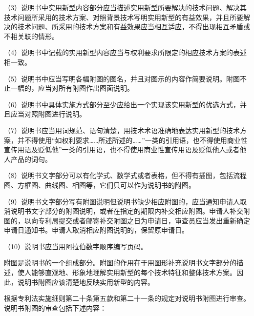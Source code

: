 {\setlength{\parindent}{17.1bp}（3）说明书中实用新型内容部分应当描述实用新型所要解决的技术问题、解决其技术问题所采用的技术方案、对照背景技术写明实用新型的有益效果，并且所要解决的技术问题、所采用的技术方案和有益效果应当相互适应，不得出现相互矛盾或不相关联的情形。\par}

{\setlength{\parindent}{17.1bp}（4）说明书中记载的实用新型内容应当与权利要求所限定的相应技术方案的表述相一致。\par}

{\setlength{\parindent}{17.1bp}（5）说明书中应当写明各幅附图的图名，并且对图示的内容作简要说明。附图不止一幅的，应当对所有附图作出图面说明。\par}

{\setlength{\parindent}{17.1bp}（6）说明书中具体实施方式部分至少应给出一个实现该实用新型的优选方式，并且应当对照附图进行说明。\par}

{\setlength{\parindent}{17.1bp}（7）说明书应当用词规范、语句清楚，用技术术语准确地表达实用新型的技术方案，并不得使用“如权利要求……所述所述的……”一类的引用语，也不得使用商业性宣传用语及贬低他”一类的引用语，也不得使用商业性宣传用语及贬低他人或者他人产品的词句。\par}

{\setlength{\parindent}{17.1bp}（8）说明书文字部分可以有化学式、数学式或者表格，但不得有插图，包括流程图、方框图、曲线图、相图等，它们只可以作为说明书的附图。\par}

{\setlength{\parindent}{17.1bp}（9）说明书文字部分写有附图说明但说明书缺少相应附图的，应当通知申请人取消说明书文字部分的附图说明，或者在指定的期限内补交相应附图。申请人补交附图的，以向专利局提交或者邮寄补交附图之日为申请日，审查员应当发出重新确定申请日通知书。申请人取消相应附图说明的，保留原申请日。\par}

{\setlength{\parindent}{17.1bp}（10）说明书应当用阿拉伯数字顺序编写页码。\par}

附图是说明书的一个组成部分。附图的作用在于用图形补充说明书文字部分的描述，使人能够直观地、形象地理解实用新型的每个技术特征和整体技术方案。因此，说明书附图应该清楚地反映实用新型的内容。

根据专利法实施细则第二十条第五款和第二十一条的规定对说明书附图进行审查。说明书附图的审查包括下述内容：

